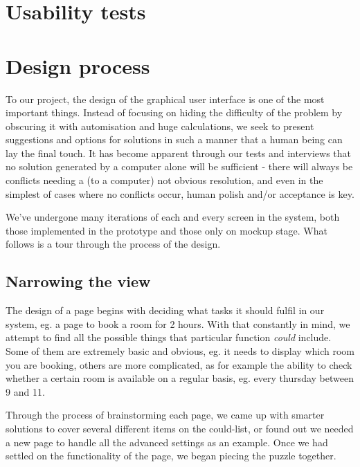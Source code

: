 \section{Usability tests} %
\label{sec:usability_tests}



\section{Design process}
\label{sec:design_process}
To our project, the design of the graphical user interface is one of the most important things. Instead of focusing on hiding the difficulty of the problem by obscuring it with automisation and huge calculations, we seek to present suggestions and options for solutions in such a manner that a human being can lay the final touch. It has become apparent through our tests and interviews that no solution generated by a computer alone will be sufficient - there will always be conflicts needing a (to a computer) not obvious resolution, and even in the simplest of cases where no conflicts occur, human polish and/or acceptance is key.

We've undergone many iterations of each and every screen in the system, both those implemented in the prototype and those only on mockup stage. What follows is a tour through the process of the design.



\subsection{Narrowing the view}
The design of a page begins with deciding what tasks it should fulfil in our system, eg. a page to book a room for 2 hours. With that constantly in mind, we attempt to find all the possible things that particular function \emph{could} include. Some of them are extremely basic and obvious, eg. it needs to display which room you are booking, others are more complicated, as for example the ability to check whether a certain room is available on a regular basis, eg. every thursday between 9 and 11.

Through the process of brainstorming each page, we came up with smarter solutions to cover several different items on the could-list, or found out we needed a new page to handle all the advanced settings as an example. Once we had settled on the functionality of the page, we began piecing the puzzle together.



